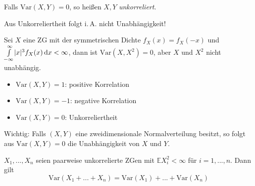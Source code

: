 \documentclass{cheat-sheet}
\newcommand{\E}{\mathbb{E}} %
\newcommand{\Var}{\mathrm{Var}} %
\newcommand{\cov}{\mathrm{Var}} %
\newcommand{\cor}{\mathrm{Var}} %
\begin{document}
\begin{defn}
  Falls $\cor(X, Y) = 0$, so heißen $X, Y$ \emph{unkorreliert}.
\end{defn}

\begin{acht}
  Aus Unkorreliertheit folgt i.\,A. nicht Unabhängigkeit!
\end{acht}

\begin{bsp}
  Sei $X$ eine ZG mit der symmetrischen Dichte $f_X(x) = f_X(-x)$ und ${\textstyle \int\limits_{-\infty}^{\infty}} \lvert x\rvert^3 f_X(x) \,\mathrm{d} x < \infty$, dann ist $\cov(X, X^2) = 0$, aber $X$ und $X^2$ nicht unabhängig.
\end{bsp}

\begin{bem}
  \begin{itemize}
    \item $\cor(X, Y) = 1$: positive Korrelation
    \item $\cor(X, Y) = -1$: negative Korrelation
    \item $\cor(X, Y) = 0$: Unkorreliertheit
  \end{itemize}
\end{bem}

Wichtig: Falls $(X, Y)$ eine zweidimensionale Normalverteilung besitzt, so folgt aus $\cor(X, Y) = 0$ die Unabhängigkeit von $X$ und $Y$.

\begin{satz}
  $X_1, ..., X_n$ seien paarweise unkorrelierte ZGen mit $\E X_i^2 < \infty$ für $i = 1, ..., n$. Dann gilt
  \[ \Var(X_1 + ... + X_n) = \Var(X_1) + ... + \Var(X_n) \]
\end{satz}
\end{document}
